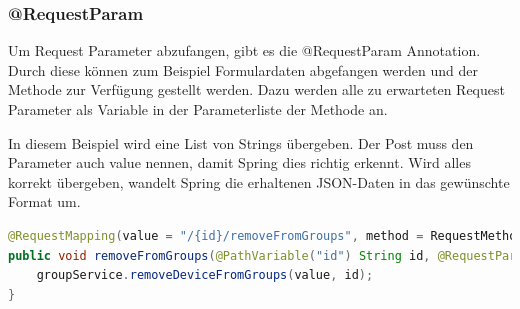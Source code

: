 \subsubsection{@RequestParam}
Um Request Parameter abzufangen, gibt es die @RequestParam Annotation. Durch diese können zum Beispiel Formulardaten abgefangen werden und der Methode zur Verfügung gestellt werden. Dazu werden alle zu erwarteten Request Parameter als Variable in der Parameterliste der Methode an.

In diesem Beispiel wird eine List von Strings übergeben. Der Post muss den Parameter auch value nennen, damit Spring dies richtig erkennt. Wird alles korrekt übergeben, wandelt Spring die erhaltenen JSON-Daten in das gewünschte Format um.
\begin{lstlisting}[language=java]
@RequestMapping(value = "/{id}/removeFromGroups", method = RequestMethod.POST)
public void removeFromGroups(@PathVariable("id") String id, @RequestParam("value") List<String> value) {
	groupService.removeDeviceFromGroups(value, id);
}
\end{lstlisting}
